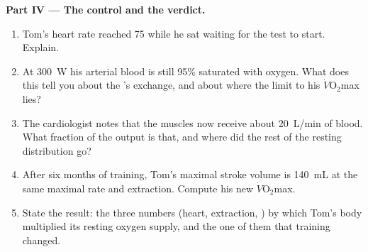 \begin{problem}
\medskip
\noindent\textbf{Part IV --- The control and the verdict.}
\begin{enumerate}[resume]
  \item Tom's heart rate reached 75 while he sat waiting for the test
        to start. Explain.
  \item At \qty{300}{W} his arterial blood is still 95\% saturated
        with oxygen. What does this tell you about the 's
        exchange, and about where the limit to his
        $\dot V\!\mathrm{O_2}$max lies?
  \item The cardiologist notes that the muscles now receive about
        \qty{20}{L/min} of blood. What fraction of the output is that,
        and where did the rest of the resting distribution go?
  \item After six months of training, Tom's maximal stroke volume is
        \qty{140}{mL} at the same maximal rate and extraction. Compute
        his new $\dot V\!\mathrm{O_2}$max.
  \item State the result: the three numbers (heart, extraction,
        ) by which Tom's body multiplied its resting oxygen
        supply, and the one of them that training changed.
\end{enumerate}
\end{problem}
